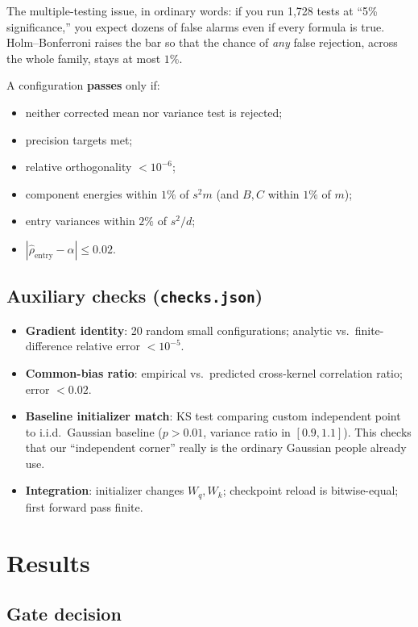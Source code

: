 \documentclass[11pt,a4paper]{report}
\begin{document}
The multiple-testing issue, in ordinary words: if you run 1{,}728 tests at ``5\% significance,'' you expect dozens of false alarms even if every formula is true. Holm--Bonferroni raises the bar so that the chance of \emph{any} false rejection, across the whole family, stays at most $1\%$.

A configuration \textbf{passes} only if:
\begin{itemize}[leftmargin=*]
  \item neither corrected mean nor variance test is rejected;
  \item precision targets met;
  \item relative orthogonality $<10^{-6}$;
  \item component energies within $1\%$ of $s^2 m$ (and $B,C$ within $1\%$ of $m$);
  \item entry variances within $2\%$ of $s^2/d$;
  \item $|\widehat\rho_{\mathrm{entry}}-\alpha|\le 0.02$.
\end{itemize}

\subsection{Auxiliary checks (\texttt{checks.json})}

\begin{itemize}[leftmargin=*]
  \item \textbf{Gradient identity}: 20 random small configurations; analytic vs.\ finite-difference relative error $<10^{-5}$.
  \item \textbf{Common-bias ratio}: empirical vs.\ predicted cross-kernel correlation ratio; error $<0.02$.
  \item \textbf{Baseline initializer match}: KS test comparing custom independent point to i.i.d.\ Gaussian baseline ($p>0.01$, variance ratio in $[0.9,1.1]$). This checks that our ``independent corner'' really is the ordinary Gaussian people already use.
  \item \textbf{Integration}: initializer changes $W_q,W_k$; checkpoint reload is bitwise-equal; first forward pass finite.
\end{itemize}

\section{Results}

\subsection{Gate decision}
\end{document}
